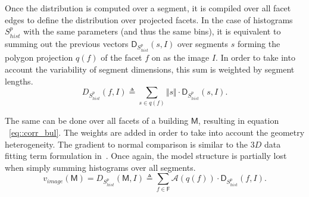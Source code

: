 \documentclass[runningheads]{llncs}
\begin{document}
\begin{figure}
	\begin{center}
	\end{center}
\end{figure}

Once the distribution is computed over a segment, it is compiled over all facet edges to define the distribution over projected facets. In the case of histograms $S_{hist}^p$ with the same parameters (and thus the same bins), it is equivalent to summing out the previous vectors $\mathsf{D}_{S_{hist}^p}(s, I)$ over segments $s$ forming the polygon projection $q(f)$ of the facet $f$ on as the image $I$. In order to take into account the variability of segment dimensions, this sum is weighted by segment lengths.
\begin{equation}
	\label{eq::corr_fac}
	D_{S_{hist}^p}(f, I) \triangleq \sum_{s \in q(f)} \Vert s \Vert \cdot \mathsf{D}_{S_{hist}^p}(s, I).
\end{equation}

The same can be done over all facets of a building $\mathsf{M}$, resulting in equation ~\ref{eq::corr_bul}. The weights are added in order to take into account the geometry heterogeneity. The gradient to normal comparison is similar to the $3D$ data fitting term formulation in~\cite{li2016boxfitting}. Once again, the model structure is partially lost when simply summing histograms over all segments.
\begin{equation}
	\label{eq::corr_bul}
	v_{image}(\mathsf{M}) = D_{S_{hist}^p}(\mathsf{M}, I) \triangleq \sum_{f \in \mathsf{F}} \mathscr{A}(q(f)) \cdot \mathsf{D}_{S_{hist}^p}(f, I).
\end{equation}
\end{document}

